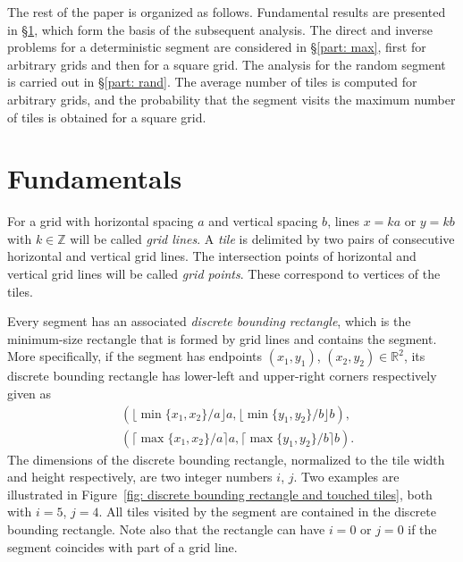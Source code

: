 \documentclass[12pt, a4paper]{article}
\begin{document}
The rest of the paper is organized as follows. Fundamental results are presented in \S\ref{part: fund results}, which form the basis of the subsequent analysis. The direct and inverse problems for a deterministic segment are considered in \S\ref{part: max}, first for arbitrary grids and then for a square grid. The analysis for the random segment is carried out in \S\ref{part: rand}. The average number of tiles is computed for arbitrary grids, and the probability that the segment visits the maximum number of tiles is obtained for a square grid.



\section{Fundamentals}
\label{part: fund results}

For a grid with horizontal spacing $a$ and vertical spacing $b$, lines $x = ka$ or $y = kb$ with $k \in \mathbb Z$ will be called \emph{grid lines}. A \emph{tile} is delimited by two pairs of consecutive horizontal and vertical grid lines. The intersection points of horizontal and vertical grid lines will be called \emph{grid points}. These correspond to vertices of the tiles.

Every segment has an associated \emph{discrete bounding rectangle}, which is the minimum-size rectangle that is formed by grid lines and contains the segment. More specifically, if the segment has endpoints $(x_1,y_1)$, $(x_2,y_2) \in \mathbb R^2$, its discrete bounding rectangle has lower-left and upper-right corners respectively given as
\begin{align*}
& (\lfloor\min\{x_1, x_2\}/a\rfloor a, \lfloor\min\{y_1,y_2\}/b\rfloor b), \\
& (\lceil\max\{x_1, x_2\}/a \rceil a, \lceil\max\{y_1,y_2\}/b \rceil b).
\end{align*}
The dimensions of the discrete bounding rectangle, normalized to the tile width and height respectively, are two integer numbers $i$, $j$. Two examples are illustrated in Figure~\ref{fig: discrete bounding rectangle and touched tiles}, both with $i=5$, $j=4$. All tiles visited by the segment are contained in the discrete bounding rectangle. Note also that the rectangle can have $i=0$ or $j=0$ if the segment coincides with part of a grid line.
\end{document}

